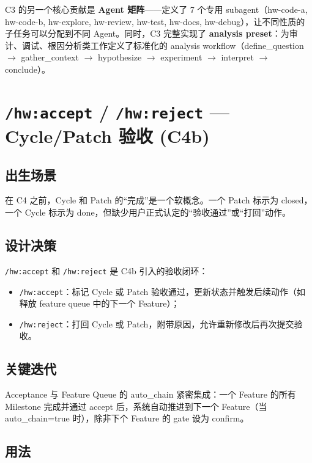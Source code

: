 \documentclass[
  outputdir=build,
  chapterstyle=cn,
  colorscheme=Simple,
  fontset=tech,
  code=false
]{Hypo-Note}
\begin{document}
C3 的另一个核心贡献是 \textbf{Agent 矩阵}——定义了 7 个专用 subagent（hw-code-a, hw-code-b, hw-explore, hw-review, hw-test, hw-docs, hw-debug），让不同性质的子任务可以分配到不同 Agent。同时，C3 完整实现了 \textbf{analysis preset}：为审计、调试、根因分析类工作定义了标准化的 analysis workflow（define\_question $\rightarrow$ gather\_context $\rightarrow$ hypothesize $\rightarrow$ experiment $\rightarrow$ interpret $\rightarrow$ conclude）。

\section{\texttt{/hw:accept} / \texttt{/hw:reject} — Cycle/Patch 验收 (C4b)}

\subsection{出生场景}

在 C4 之前，Cycle 和 Patch 的“完成”是一个软概念。一个 Patch 标示为 closed，一个 Cycle 标示为 done，但缺少用户正式认定的“验收通过”或“打回”动作。

\subsection{设计决策}

\texttt{/hw:accept} 和 \texttt{/hw:reject} 是 C4b 引入的验收闭环：

\begin{itemize}[leftmargin=2em]
  \item \texttt{/hw:accept}：标记 Cycle 或 Patch 验收通过，更新状态并触发后续动作（如释放 feature queue 中的下一个 Feature）；
  \item \texttt{/hw:reject}：打回 Cycle 或 Patch，附带原因，允许重新修改后再次提交验收。
\end{itemize}

\subsection{关键迭代}

Acceptance 与 Feature Queue 的 auto\_chain 紧密集成：一个 Feature 的所有 Milestone 完成并通过 accept 后，系统自动推进到下一个 Feature（当 auto\_chain=true 时），除非下个 Feature 的 gate 设为 confirm。

\subsection{用法}
\end{document}
